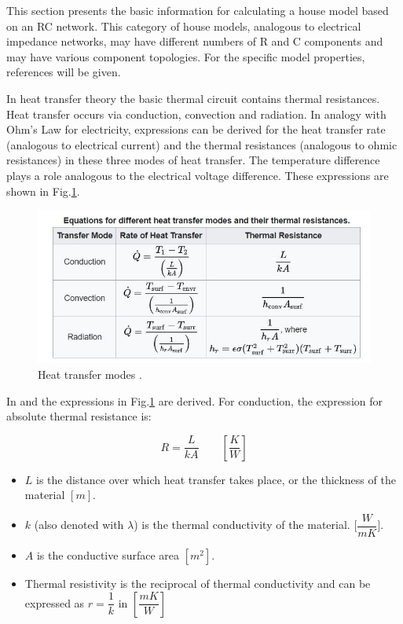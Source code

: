 This section presents the basic information for calculating a house model based on an RC network. This category of house models, analogous to electrical impedance networks, may have different numbers of R and C components and may have various component topologies. For the specific model properties, references will be given.

In heat transfer theory the basic thermal circuit contains thermal resistances. Heat transfer occurs via conduction, convection and radiation. In analogy with Ohm's Law for electricity, expressions can be derived for the heat transfer rate (analogous to electrical current) and the thermal resistances (analogous to ohmic resistances) in these three modes of heat transfer. The temperature difference plays a role analogous to the electrical voltage difference. These expressions are shown in Fig.\ref{fig:lumped_table}.
\begin{figure}[H]
	\centering
	\includegraphics[width=0.6\columnwidth]{Pictures/heat transfer mode.JPG}
	\caption[Short title]{Heat transfer modes \cite{GIGO}.}
	\label{fig:lumped_table}
\end{figure}
\newpage

In \cite{HTTHERMO} and \cite{FUND} the expressions in Fig.\ref{fig:lumped_table} are derived.
For conduction, the expression for absolute thermal resistance is:  

\begin{equation}
	R = \frac{L}{kA} \qquad \left[ \frac{K}{W} \right]
\end{equation}

\begin{itemize}
    \item $L$ is the distance over which heat transfer takes place, or the thickness of the material $[m]$.
    \item $k$ (also denoted with $\lambda$) is the thermal conductivity of the material. [$\dfrac{W}{mK}$]. 
    \item $A$ is the conductive surface area  $[m^2]$.
    \item Thermal resistivity is the reciprocal of thermal conductivity and can be expressed as $r =\dfrac{1}{k}$  in $[\dfrac{mK}{W}]$

\end{itemize}


